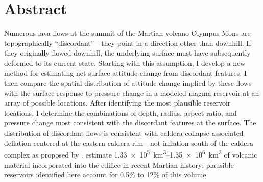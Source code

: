 \chapter{Abstract}
Numerous lava flows at the summit of the Martian volcano Olympus Mons are topographically ``discordant''---they point in a direction other than downhill. If they originally flowed downhill, the underlying surface must have subsequently deformed to its current state. Starting with this assumption, I develop a new method for estimating net surface attitude change from discordant features. I then compare the spatial distribution of attitude change implied by these flows with the surface response to pressure change in a modeled magma reservoir at an array of possible locations. After identifying the most plausible reservoir locations, I determine the combinations of depth, radius, aspect ratio, and pressure change most consistent with the discordant features at the surface. The distribution of discordant flows is consistent with caldera-collapse-associated deflation centered at the eastern caldera rim---not inflation south of the caldera complex as proposed by \textcite{mouginis-mark_late-stage_2019}. \textcite{chadwick_late_2015} estimate \qtyrange{1.33e5}{1.35e6}{\km\cubed} of volcanic material incorporated into the edifice in recent Martian history; plausible reservoirs identified here account for 0.5\% to 12\% of this volume.